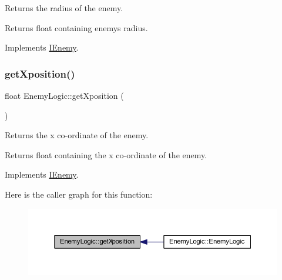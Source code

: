 Returns the radius of the enemy. 

\begin{DoxyReturn}{Returns}
float containing enemy\textquotesingle{}s radius. 
\end{DoxyReturn}


Implements \hyperlink{class_i_enemy_ab1fb8f6320916ef6a1497f9651704d05}{I\+Enemy}.

\mbox{\label{class_enemy_logic_a7eed969ab8e3d2527cdac04ef39a5aba}} 
\subsubsection{\texorpdfstring{get\+Xposition()}{getXposition()}}
{\footnotesize\ttfamily float Enemy\+Logic\+::get\+Xposition (\begin{DoxyParamCaption}{ }\end{DoxyParamCaption})\hspace{0.3cm}{\ttfamily [virtual]}}



Returns the x co-\/ordinate of the enemy. 

\begin{DoxyReturn}{Returns}
float containing the x co-\/ordinate of the enemy. 
\end{DoxyReturn}


Implements \hyperlink{class_i_enemy_a504ea7fa77b8984d5b9dd71352876943}{I\+Enemy}.

Here is the caller graph for this function\+:\nopagebreak
\begin{figure}[H]
\begin{center}
\leavevmode
\includegraphics[width=350pt]{class_enemy_logic_a7eed969ab8e3d2527cdac04ef39a5aba_icgraph}
\end{center}
\end{figure}
\mbox{\label{class_enemy_logic_ae614032054926a4a25ed56f61111392b}} 
